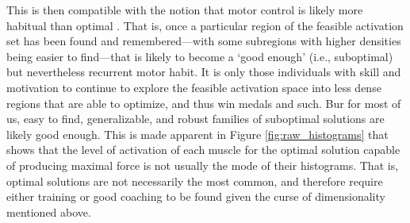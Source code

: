 This is then compatible with the notion that motor control is likely more habitual than optimal \cite{deRugy2012habitual}. That is, once a particular region of the feasible activation set has been found and remembered---with some subregions with higher densities being easier to find---that is likely to become a `good enough' (i.e., suboptimal) but nevertheless recurrent motor habit. It is only those individuals with skill and motivation to continue to explore the feasible activation space into less dense regions that are able to optimize, and thus win medals and such. Bur for most of us,  easy to find, generalizable, and robust families of suboptimal solutions are likely good enough.  This is made apparent in Figure \ref{fig:raw_histograms} that shows that the level of activation of each muscle for the optimal solution capable of producing maximal  force is not usually the mode of their histograms. That is, optimal solutions are not necessarily the most common, and therefore require either training or good coaching to be found given the curse of dimensionality mentioned above.

